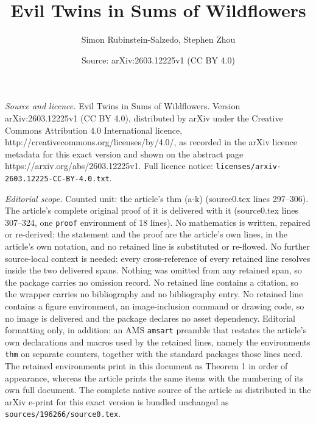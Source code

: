 \documentclass[10pt,a4paper]{amsart}
\title{Evil Twins in Sums of Wildflowers}
\author{Simon Rubinstein-Salzedo, Stephen Zhou}
\date{Source: arXiv:2603.12225v1 (CC BY 4.0)}
\begin{document}
\maketitle

\noindent\emph{Source and licence.} Evil Twins in Sums of Wildflowers. Version arXiv:2603.12225v1 (CC BY 4.0), distributed by arXiv under the Creative Commons Attribution 4.0 International licence, http://creativecommons.org/licenses/by/4.0/, as recorded in the arXiv licence metadata for this exact version and shown on the abstract page https://arxiv.org/abs/2603.12225v1. Full licence notice: \texttt{licenses/arxiv-2603.12225-CC-BY-4.0.txt}.\par\smallskip

\noindent\textit{Editorial scope.} Counted unit: the article's thm (a-k) (source0.tex lines 297--306). The article's complete original proof of it is delivered with it (source0.tex lines 307--324, one \texttt{proof} environment of 18 lines). No mathematics is written, repaired or re-derived: the statement and the proof are the article's own lines, in the article's own notation, and no retained line is substituted or re-flowed.  No further source-local context is needed: every cross-reference of every retained line resolves inside the two delivered spans.  Nothing was omitted from any retained span, so the package carries no omission record.  No retained line contains a citation, so the wrapper carries no bibliography and no bibliography entry.  No retained line contains a figure environment, an image-inclusion command or drawing code, so no image is delivered and the package declares no asset dependency.  Editorial formatting only, in addition: an AMS \texttt{amsart} preamble that restates the article's own declarations and macros used by the retained lines, namely the environments \texttt{thm} on separate counters, together with the standard packages those lines need.  The retained environments print in this document as Theorem 1 in order of appearance, whereas the article prints the same items with the numbering of its own full document.  The complete native source of the article as distributed in the arXiv e-print for this exact version is bundled unchanged as \texttt{sources/196266/source0.tex}.
\end{document}
